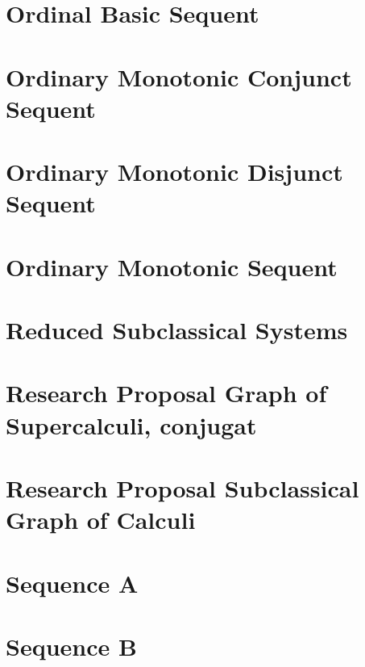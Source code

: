 \documentclass{report}
\begin{document}
\chapter{Ordinal Basic Sequent}
%

\chapter{Ordinary Monotonic Conjunct Sequent}
%

\chapter{Ordinary Monotonic Disjunct Sequent}
%

\chapter{Ordinary Monotonic Sequent}
%

\chapter{Reduced Subclassical Systems}
%

\chapter{Research Proposal Graph of Supercalculi, conjugat}
%

\chapter{Research Proposal Subclassical Graph of Calculi}
%

\chapter{Sequence A}
%

\chapter{Sequence B}
%
\end{document}
